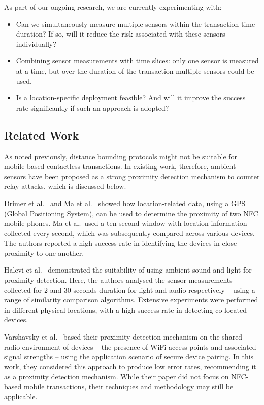 \documentclass[runningheads,a4paper]{llncs}
\begin{document}
As part of our ongoing research, we are currently experimenting with:

\begin{itemize}
\item Can we simultaneously measure multiple sensors within the transaction time duration?  If so, will it reduce the risk associated with these sensors individually?
\item Combining sensor measurements with time slices: only one sensor is measured at a time, but over the duration of the transaction multiple sensors could be used.
\item Is a location-specific deployment feasible? And will it improve the success rate significantly if such an approach is adopted?
\end{itemize}




\subsection{Related Work}
\label{sec:RelatedWork}
As noted previously, distance bounding protocols might not be suitable for mobile-based contactless transactions.  In existing work, therefore, ambient sensors have been proposed as a strong proximity detection mechanism to counter relay attacks, which is discussed below.

Drimer et al.\ \cite{DrimerM07} and Ma et al.\ \cite{6378376} showed how location-related data, using a GPS (Global Positioning System), can be used to determine the proximity of two NFC mobile phones.  Ma et al.\ used a ten second window with location information collected every second, which was subsequently compared across various devices.  The authors reported a high success rate in identifying the devices in close proximity to one another.

Halevi et al.\ \cite{Halevi2012} demonstrated the suitability of using ambient sound and light for proximity detection.  Here, the authors analysed the sensor measurements -- collected for 2 and 30 seconds duration for light and audio respectively -- using a range of similarity comparison algorithms.  Extensive experiments were performed in different physical locations, with a high success rate in detecting co-located devices.

Varshavsky et al.\ \cite{Varshavsky2007} based their proximity detection mechanism on the shared radio environment of devices -- the presence of WiFi access points and associated signal strengths -- using the application scenario of secure device pairing.  In this work, they considered this approach to produce low error rates, recommending it as a proximity detection mechanism.  While their paper did not focus on NFC-based mobile transactions, their techniques and methodology may still be applicable.
\end{document}
